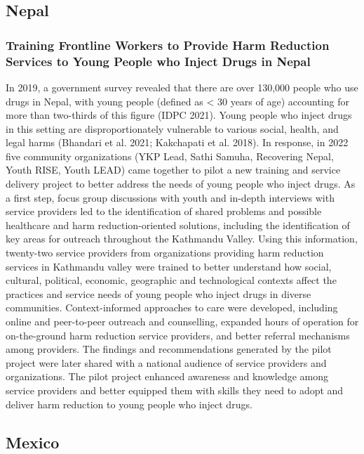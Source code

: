 \documentclass[
  letterpaper,
  DIV=11,
  numbers=noendperiod]{scrartcl}
\begin{document}
\subsection{Nepal}

\subsubsection{Training Frontline Workers to Provide Harm Reduction
Services to Young People who Inject Drugs in
Nepal}\label{training-frontline-workers-to-provide-harm-reduction-services-to-young-people-who-inject-drugs-in-nepal}

In 2019, a government survey revealed that there are over 130,000 people
who use drugs in Nepal, with young people (defined as \textless{} 30
years of age) accounting for more than two-thirds of this figure (IDPC
2021). Young people who inject drugs in this setting are
disproportionately vulnerable to various social, health, and legal harms
(Bhandari et al. 2021; Kakchapati et al. 2018). In response, in 2022
five community organizations (YKP Lead, Sathi Samuha, Recovering Nepal,
Youth RISE, Youth LEAD) came together to pilot a new training and
service delivery project to better address the needs of young people who
inject drugs. As a first step, focus group discussions with youth and
in-depth interviews with service providers led to the identification of
shared problems and possible healthcare and harm reduction-oriented
solutions, including the identification of key areas for outreach
throughout the Kathmandu Valley. Using this information, twenty-two
service providers from organizations providing harm reduction services
in Kathmandu valley were trained to better understand how social,
cultural, political, economic, geographic and technological contexts
affect the practices and service needs of young people who inject drugs
in diverse communities. Context-informed approaches to care were
developed, including online and peer-to-peer outreach and counselling,
expanded hours of operation for on-the-ground harm reduction service
providers, and better referral mechanisms among providers. The findings
and recommendations generated by the pilot project were later shared
with a national audience of service providers and organizations. The
pilot project enhanced awareness and knowledge among service providers
and better equipped them with skills they need to adopt and deliver harm
reduction to young people who inject drugs.

\subsection{Mexico}
\end{document}
